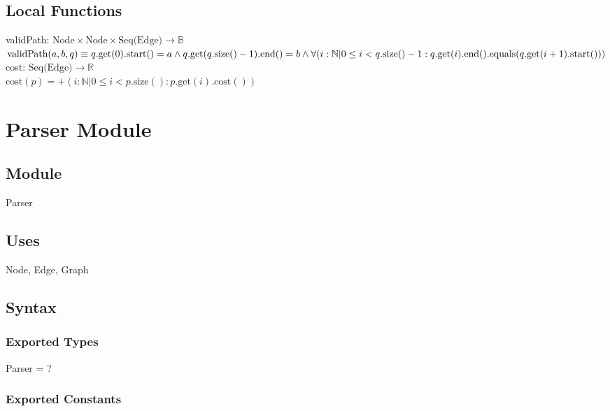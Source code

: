 \documentclass[12pt]{article}
\begin{document}
\subsection*{Local Functions}

\noindent validPath: $\mbox{Node} \times \mbox{Node} \times \mbox{Seq(Edge)} \rightarrow \mathbb{B}$\\
\noindent 
$\mbox{validPath}(a,b, q) \equiv
q.\mbox{get}(0).\mbox{start}() = a \land q.\mbox{get}(q.\mbox{size}()-1).\mbox{end}() = b \land \\
\forall (i : \mathbb{N} | 0 \le i < q.\mbox{size}()-1 : q.\mbox{get}(i).\mbox{end}().\mbox{equals}(q.\mbox{get}(i+1).\mbox{start}()))$\\

\noindent cost: $\mbox{Seq(Edge)} \rightarrow \mathbb{R}$\\
\noindent 
$\mbox{cost}(p) =
+ (i : \mathbb{N} | 0 \le i < p.\mbox{size}() : p.\mbox{get}(i).\mbox{cost}())$\\

\newpage

\section{Parser Module}

\subsection*{Module}

Parser

\subsection*{Uses}

Node, Edge, Graph

\subsection*{Syntax}

\subsubsection*{Exported Types}

Parser = ?

\subsubsection*{Exported Constants}
\end{document}
